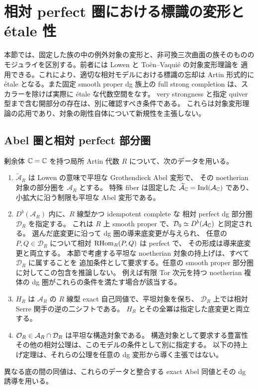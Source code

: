\section{相対 perfect 圏における標識の変形と \'etale 性}
\label{sec:relative-marked-deformations}

本節では、固定した族の中の例外対象の変形と、非可換三次曲面の族そのものの
モジュライを区別する。前者には Lowen と To\"en--Vaqui\'e の対象変形理論を
適用できる。これにより、適切な相対モデルにおける標識の忘却は
Artin 形式的に \'etale となる。また固定 smooth proper dg 族上の
full strong completion は、スカラーを除けば実際に \'etale な代数空間をなす。
very strongness と指定 quiver 型まで含む開部分の存在は、別に確認すべき条件である。
これらは対象変形理論の応用であり、対象の剛性自体について新規性を主張しない。

\subsection{Abel 圏と相対 perfect 部分圏}

\begin{definition}
\label{def:admissible-artin-dg-model}
剰余体 $\mathbb C=\mathbb C$ を持つ局所 Artin 代数 $R$ について、次のデータを用いる。
\begin{enumerate}
\item $\widetilde{\mathcal A}_R$ は Lowen の意味で平坦な Grothendieck Abel 変形で、
その noetherian 対象の部分圏を $\mathcal A_R$ とする。
特殊 fiber は固定した $\widetilde{\mathcal A}_{\mathbb C}=\operatorname{Ind}(\mathcal A_{\mathbb C})$ であり、
小拡大に沿う制限も平坦な Abel 変形である。
\item $D^b(\mathcal A_R)$ 内に、$R$ 線型かつ idempotent complete な
相対 perfect dg 部分圏 $\mathcal D_R$ を指定する。
これは $R$ 上 smooth proper で、$\mathcal D_0\simeq D^b(\mathcal A_{\mathbb C})$ と同定される。
選んだ底変更に沿って dg 圏の導来底変更が与えられ、
任意の $P,Q\in\mathcal D_R$ について相対 $\operatorname{RHom}_R(P,Q)$ は perfect で、
その形成は導来底変更と両立する。
本節で考慮する平坦な noetherian 対象の持上げは、すべて $\mathcal D_R$ に属することを
追加条件として要求する。任意の smooth proper 部分圏に対してこの包含を推論しない。
例えば有限 Tor 次元を持つ noetherian 複体の dg 圏がこれらの条件を満たす場合が該当する。
\item $H_R$ は $\mathcal A_R$ の $R$ 線型 exact 自己同値で、平坦対象を保ち、
$\mathcal D_R$ 上では相対 Serre 関手の逆の二シフトである。
$H_R$ とその全冪は指定した底変更と両立する。
\item $\mathcal O_R\in\mathcal A_R\cap\mathcal D_R$ は平坦な構造対象である。
構造対象として要求する豊富性その他の相対公理は、このモデルの条件として別に指定する。
以下の持上げ定理は、それらの公理を任意の dg 変形から導く主張ではない。
\end{enumerate}
異なる底の間の同値は、これらのデータと整合する exact Abel 同値とその dg 誘導を用いる。
\end{definition}

